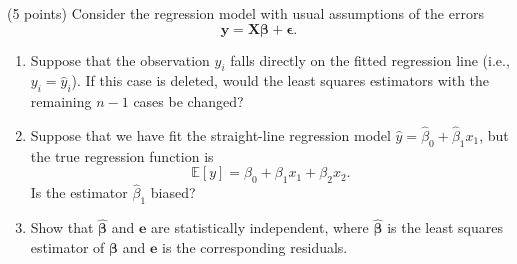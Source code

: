 \documentclass[answers]{exam}
\newcommand{\bs}{\boldsymbol}
\begin{document}
\newpage
{}
\begin{questions}
   \question
   (5 points) Consider the regression model with usual assumptions of the errors
   $$
   \bs{y} = \bs{X\beta} + \bs{\epsilon}.
   $$
   \begin{enumerate}[label=(\alph*)]
   \item Suppose that the observation $y_{i}$ falls directly on the fitted regression line (i.e., $y_{i}=\hat{y}_{i}$). If this case is deleted, would the least squares estimators with the remaining $n-1$ cases be changed? 
   \item Suppose that we have fit the straight-line regression model $\hat{y}=\hat{\beta}_{0}+\hat{\beta}_{1}x_{1}$, but the true regression function is
   $$
      \mathbb{E}\left[y\right] = \beta_{0} + \beta_{1}x_{1} + \beta_{2}x_{2}.
   $$
   Is the estimator $\hat{\beta}_{1}$ biased?
   \item Show that $\hat{\bs{\beta}}$ and $\bs{e}$ are statistically independent, where $\hat{\bs{\beta}}$ is the least squares estimator of $\bs{\beta}$ and $\bs{e}$ is the corresponding residuals.
   \end{enumerate}
   \begin{solution}

   \end{solution}
   \begin{solution}


\end{solution}
\end{questions}
\end{document}
